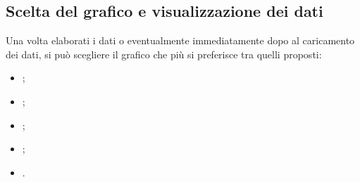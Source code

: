 \newpage
\subsection{Scelta del grafico e visualizzazione dei dati}
Una volta elaborati i dati o eventualmente immediatamente dopo al caricamento dei dati, si può scegliere il grafico che più si preferisce tra quelli proposti:
\begin{itemize}
	\item {};
	\item {};
	\item {};
	\item {};
	\item {}.
\end{itemize}

